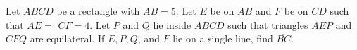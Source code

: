 Let $A B C D$ be a rectangle with $A B=5$. Let $E$ be on $\overline{A B}$ and $F$ be on $\overline{C D}$ such that $A E=$ $C F=4$. Let $P$ and $Q$ lie inside $A B C D$ such that triangles $A E P$ and $C F Q$ are equilateral. If $E, P, Q$, and $F$ lie on a single line, find $\overline{BC}$.